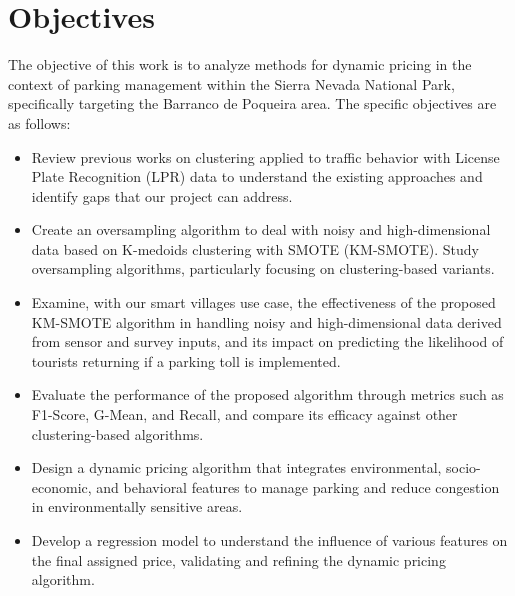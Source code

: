 \documentclass[12pt]{book}
\begin{document}

\section{Objectives}

The objective of this work is to analyze methods for dynamic pricing in the context of parking management within the Sierra Nevada National Park, specifically targeting the Barranco de Poqueira area. The specific objectives are as follows:

\begin{itemize}
    \item Review previous works on clustering applied to traffic behavior with License Plate Recognition (LPR) data to understand the existing approaches and identify gaps that our project can address.
    \item Create an oversampling algorithm to deal with noisy and high-dimensional data based on K-medoids clustering with SMOTE (KM-SMOTE). Study oversampling algorithms, particularly focusing on clustering-based variants.
    \item Examine, with our smart villages use case, the effectiveness of the proposed KM-SMOTE algorithm in handling noisy and high-dimensional data derived from sensor and survey inputs, and its impact on predicting the likelihood of tourists returning if a parking toll is implemented.
    \item Evaluate the performance of the proposed algorithm through metrics such as F1-Score, G-Mean, and Recall, and compare its efficacy against other clustering-based algorithms.
    \item Design a dynamic pricing algorithm that integrates environmental, socio-economic, and behavioral features to manage parking and reduce congestion in environmentally sensitive areas.
    \item Develop a regression model to understand the influence of various features on the final assigned price, validating and refining the dynamic pricing algorithm.
\end{itemize}
\end{document}
